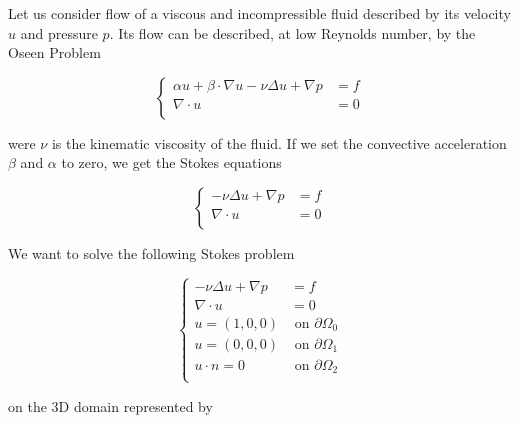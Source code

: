 %
%
%
%
%


Let us consider flow of a viscous and incompressible fluid described by its velocity $u$
and pressure $p$. Its flow can be described, at low Reynolds number, by the Oseen Problem 

\begin{equation} \label{eqn-oseen}
\left\{
\begin{array}{lc}
\displaystyle \alpha u + \beta \cdot \nabla u - \nu \Delta u +
\nabla p & = f \\
\displaystyle \nabla \cdot u & = 0  \\
\end{array}
\right.
\end{equation}

were $\nu$ is the kinematic viscosity of the fluid. If we set the convective
acceleration $\beta$ and $\alpha$ to zero, we get the Stokes equations

\begin{equation} \label{eqn-stokes}
\left\{
\begin{array}{lc}
- \nu \Delta u+
\nabla p & = f \\
\displaystyle \nabla \cdot u & = 0  \\
\end{array}
\right.
\end{equation}

We want to solve the following Stokes problem

\begin{equation} \label{eqn-stokes}
\left\{
\begin{array}{lc}
\displaystyle - \nu \Delta u+
\nabla p & = f \\
\displaystyle \nabla \cdot u & = 0  \\
u = (1, 0, 0) & \mbox{ on } \partial \Omega_0 \\
u = (0, 0, 0) & \mbox{ on } \partial \Omega_1  \\
u \cdot n = 0 & \mbox { on } \partial \Omega_2\\
\end{array}
\right.
\end{equation}

on the 3D domain represented by 

\vspace{0.5cm}
\begin{center}

\end{center}
\vspace{0.5cm}

